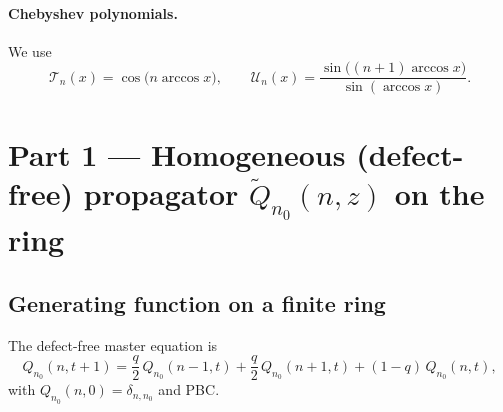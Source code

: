 \documentclass[11pt]{article}
\newcommand{\T}{\mathcal{T}}
\newcommand{\U}{\mathcal{U}}
\begin{document}
\paragraph{Chebyshev polynomials.}
We use
\[
\T_n(x)=\cos\!\bigl(n\arccos x\bigr),\qquad
\U_n(x)=\frac{\sin\!\bigl((n+1)\arccos x\bigr)}{\sin(\arccos x)}.
\]

\section{Part 1 --- Homogeneous (defect-free) propagator $\tilde Q_{n_0}(n,z)$ on the ring}

\subsection{Generating function on a finite ring}

The defect-free master equation is
\begin{equation}
Q_{n_0}(n,t+1)=\frac q2\,Q_{n_0}(n-1,t)+\frac q2\,Q_{n_0}(n+1,t)+(1-q)\,Q_{n_0}(n,t),
\label{eq:master_ring}
\end{equation}
with $Q_{n_0}(n,0)=\delta_{n,n_0}$ and PBC.
\end{document}
